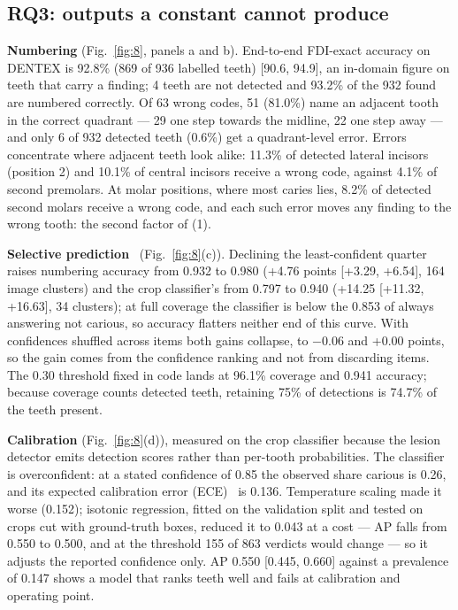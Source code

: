 \documentclass[conference]{IEEEtran}
\begin{document}
\subsection{RQ3: outputs a constant cannot produce}

\textbf{Numbering} (Fig.~\ref{fig:8}, panels a and b). End-to-end FDI-exact accuracy on DENTEX is 92.8\% (869 of 936 labelled teeth) [90.6, 94.9], an in-domain figure on teeth that carry a finding; 4 teeth are not detected and 93.2\% of the 932 found are numbered correctly. Of 63 wrong codes, 51 (81.0\%) name an adjacent tooth in the correct quadrant — 29 one step towards the midline, 22 one step away — and only 6 of 932 detected teeth (0.6\%) get a quadrant-level error. Errors concentrate where adjacent teeth look alike: 11.3\% of detected lateral incisors (position 2) and 10.1\% of central incisors receive a wrong code, against 4.1\% of second premolars. At molar positions, where most caries lies, 8.2\% of detected second molars receive a wrong code, and each such error moves any finding to the wrong tooth: the second factor of (1).

\textbf{Selective prediction}~\cite{geifman2017selective} (Fig.~\ref{fig:8}(c)). Declining the least-confident quarter raises numbering accuracy from 0.932 to 0.980 (+4.76 points [+3.29, +6.54], 164 image clusters) and the crop classifier's from 0.797 to 0.940 (+14.25 [+11.32, +16.63], 34 clusters); at full coverage the classifier is below the 0.853 of always answering not carious, so accuracy flatters neither end of this curve. With confidences shuffled across items both gains collapse, to $-$0.06 and +0.00 points, so the gain comes from the confidence ranking and not from discarding items. The 0.30 threshold fixed in code lands at 96.1\% coverage and 0.941 accuracy; because coverage counts detected teeth, retaining 75\% of detections is 74.7\% of the teeth present.

\textbf{Calibration} (Fig.~\ref{fig:8}(d)), measured on the crop classifier because the lesion detector emits detection scores rather than per-tooth probabilities. The classifier is overconfident: at a stated confidence of 0.85 the observed share carious is 0.26, and its expected calibration error (ECE)~\cite{naeini2015obtaining,guo2017calibration} is 0.136. Temperature scaling made it worse (0.152); isotonic regression, fitted on the validation split and tested on crops cut with ground-truth boxes, reduced it to 0.043 at a cost — AP falls from 0.550 to 0.500, and at the threshold 155 of 863 verdicts would change — so it adjusts the reported confidence only. AP 0.550 [0.445, 0.660] against a prevalence of 0.147 shows a model that ranks teeth well and fails at calibration and operating point.
\end{document}
